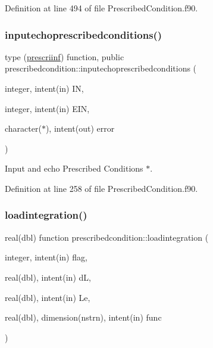 Definition at line 494 of file Prescribed\+Condition.\+f90.

\mbox{\label{namespaceprescribedcondition_a66d378b405e124a0d9a7ad04e262109b}} 
\subsubsection{\texorpdfstring{inputechoprescribedconditions()}{inputechoprescribedconditions()}}
{\footnotesize\ttfamily type (\hyperlink{structprescribedcondition_1_1prescriinf}{prescriinf}) function, public prescribedcondition\+::inputechoprescribedconditions (\begin{DoxyParamCaption}\item[{integer, intent(in)}]{IN,  }\item[{integer, intent(in)}]{E\+IN,  }\item[{character($\ast$), intent(out)}]{error }\end{DoxyParamCaption})}



Input and echo Prescribed Conditions $\ast$. 



Definition at line 258 of file Prescribed\+Condition.\+f90.

\mbox{\label{namespaceprescribedcondition_a55980eb8579eed448879c6118e6218c7}} 
\subsubsection{\texorpdfstring{loadintegration()}{loadintegration()}}
{\footnotesize\ttfamily real(dbl) function prescribedcondition\+::loadintegration (\begin{DoxyParamCaption}\item[{integer, intent(in)}]{flag,  }\item[{real(dbl), intent(in)}]{dL,  }\item[{real(dbl), intent(in)}]{Le,  }\item[{real(dbl), dimension(nstrn), intent(in)}]{func }\end{DoxyParamCaption})\hspace{0.3cm}{\ttfamily [private]}}



